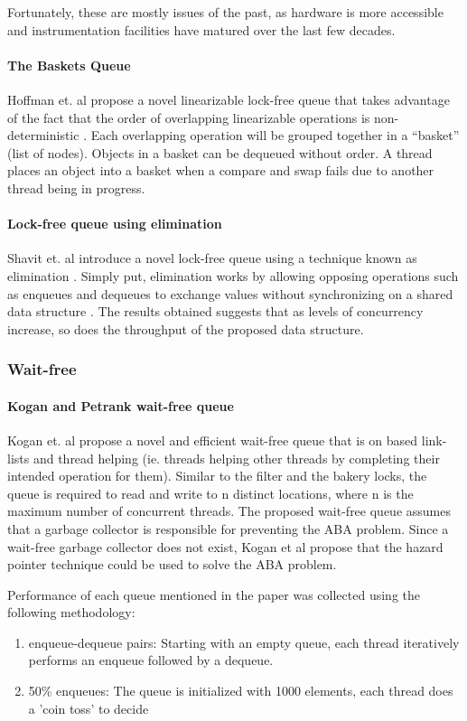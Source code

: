Fortunately, these are mostly issues of the past, as hardware is more accessible and instrumentation facilities have matured over the last few decades.

\paragraph{The Baskets Queue}
Hoffman et. al propose a novel linearizable lock-free queue that takes advantage of the fact that the order of overlapping linearizable operations is non-deterministic \cite{hoffman2007baskets}. Each overlapping operation will be grouped together in a ``basket'' (list of nodes). Objects in a basket can be dequeued without order. A thread places an object into a basket when a compare and swap fails due to another thread being in progress.

\paragraph{Lock-free queue using elimination}
Shavit et. al introduce a novel lock-free queue using a technique known as elimination \cite{moir2005using}. Simply put, elimination works by allowing opposing operations such as enqueues and dequeues to exchange values without synchronizing on a shared data structure \cite{shavit1997elimination, moir2005using}. The results obtained suggests that as levels of concurrency increase, so does the throughput of the proposed data structure.

\subsubsection{Wait-free}
\label{wait-free-queues}

\paragraph{Kogan and Petrank wait-free queue}
\label{kp-queue}

Kogan et. al propose a novel and efficient wait-free queue that is on based link-lists and thread helping (ie. threads helping other threads by completing their intended operation for them)\cite{kogan2011wait}. Similar to the filter and the bakery locks, the queue is required to read and write to n distinct locations, where n is the maximum number of concurrent threads\cite{herlihy2020art}.
The proposed wait-free queue assumes that a garbage collector is responsible for preventing the ABA problem. Since a wait-free garbage collector does not exist, Kogan et al propose that the hazard pointer technique could be used to solve the ABA problem.

Performance of each queue mentioned in the paper was collected using the following methodology:
\begin{enumerate}
  \item enqueue-dequeue pairs: Starting with an empty queue, each thread iteratively performs an enqueue followed by a dequeue.
  \item 50\% enqueues: The queue is initialized with 1000 elements, each thread does a 'coin toss' to decide
\end{enumerate}
